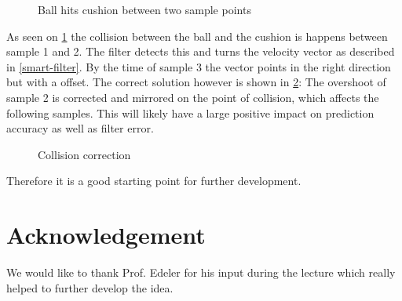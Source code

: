 \documentclass[notitlepage, a4paper, 11pt]{scrartcl}
\begin{document}
\begin{multicols}{2}
\begin{figure}[H]
    \centering
    \caption{Ball hits cushion between two sample points}
    \label{fig:edge-case}
\end{figure}

As seen on \cref{fig:edge-case} the collision between the ball and the cushion is happens between sample 1 and 2. 
The filter detects this and turns the velocity vector as described in \cref{smart-filter}.
By the time of sample 3 the vector points in the right direction but with a offset. The correct solution however is shown in \cref{fig:edge-case-sol}:
The overshoot of sample 2 is corrected and mirrored on the point of collision, which affects the following samples. 
This will likely have a large positive impact on prediction accuracy as well as filter error.

\begin{figure}[H]
    \centering
    \caption{Collision correction}
    \label{fig:edge-case-sol}
\end{figure}

Therefore it is a good starting point for further development.

\section{Acknowledgement}

We would like to thank Prof. Edeler for his input during the lecture which really helped to further develop the idea.

\end{multicols}

 

\end{document}
